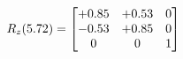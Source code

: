 \documentclass[preview]{standalone}
\begin{document}
\begin{align*}
\special{dvisvgm:raw <g id='unique000'>}R_{z}(5.72) = \begin{bmatrix}+0.85 & +0.53 & 0 \\-0.53 & +0.85 & 0 \\0 & 0 & 1\end{bmatrix}\special{dvisvgm:raw </g>}
\end{align*}
\end{document}
